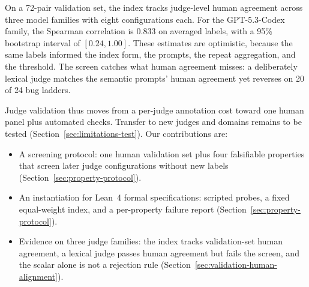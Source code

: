 On a 72-pair validation set, the index tracks judge-level human agreement across three model families with eight configurations each.
For the GPT-5.3-Codex family, the Spearman correlation is $0.833$ on averaged labels, with a 95\% bootstrap interval of $[0.24,1.00]$.
These estimates are optimistic, because the same labels informed the index form, the prompts, the repeat aggregation, and the threshold.
The screen catches what human agreement misses: a deliberately lexical judge matches the semantic prompts' human agreement yet reverses on 20 of 24 bug ladders.

Judge validation thus moves from a per-judge annotation cost toward one human panel plus automated checks.
Transfer to new judges and domains remains to be tested (Section~\ref{sec:limitations-test}).
Our contributions are:
\begin{itemize}
\item A screening protocol: one human validation set plus four falsifiable properties that screen later judge configurations without new labels (Section~\ref{sec:property-protocol}).
\item An instantiation for Lean~4 formal specifications: scripted probes, a fixed equal-weight index, and a per-property failure report (Section~\ref{sec:property-protocol}).
\item Evidence on three judge families: the index tracks validation-set human agreement, a lexical judge passes human agreement but fails the screen, and the scalar alone is not a rejection rule (Section~\ref{sec:validation-human-alignment}).
\end{itemize}
